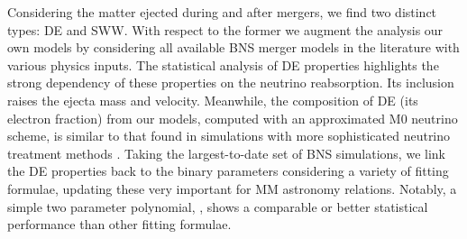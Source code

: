Considering the matter ejected during and after mergers, we find 
two distinct types: \ac{DE} and \pmerg{} \ac{SWW}. 
With respect to the former 
we augment the analysis our own models by considering all 
available \ac{BNS} merger models in the literature with various physics inputs. 
The statistical analysis of \ac{DE} properties highlights the strong 
dependency of these properties on the neutrino reabsorption. 
Its inclusion raises the ejecta mass and velocity. 
Meanwhile, the composition of \ac{DE} (its electron fraction) 
from our models, computed with an approximated M0 neutrino scheme, 
is similar to that found in simulations with more sophisticated neutrino treatment 
methods \citep{Sekiguchi:2016bjd,Vincent:2019kor}. 
Taking the largest-to-date set of \ac{BNS} simulations, we link the \ac{DE} properties 
back to the binary parameters considering a variety of fitting formulae, updating 
these very important for \ac{MM} astronomy relations. 
Notably, a simple two parameter polynomial, \polql{}, shows a comparable or 
better statistical performance than other fitting formulae.

%
%

